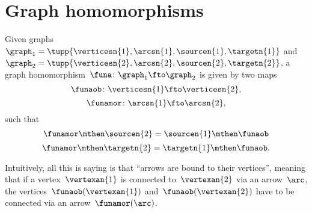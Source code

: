 
\section{Graph homomorphisms}
\begin{definition}
    \label{def:graph_homom}
    Given graphs~$\graph_1=\tupp{\verticesn{1},\arcsn{1},\sourcen{1},\targetn{1}}$ and~$\graph_2=\tupp{\verticesn{2},\arcsn{2},\sourcen{2},\targetn{2}}$, a graph homomorphism~$\funa \colon \graph_1 \fto \graph_2$ is given by two maps~
    \begin{equation}
        \funaob\colon \verticesn{1} \fto \verticesn{2},
    \end{equation}
    \begin{equation}
        \funamor\colon \arcsn{1} \fto \arcsn{2},
    \end{equation}
    such that
    \begin{equation}
        \funamor \mthen \sourcen{2} = \sourcen{1}\mthen \funaob
    \end{equation}
    \begin{equation}
        \funamor \mthen \targetn{2} = \targetn{1}\mthen \funaob.
    \end{equation}
\end{definition}


\begin{remark}
    Intuitively, all this is saying is that ``arrows are bound to their vertices'', meaning that if a vertex~$\vertexan{1}$ is connected to~$\vertexan{2}$ via an arrow~$\arc$, the vertices~$\funaob(\vertexan{1})$ and~$\funaob(\vertexan{2})$ have to be connected via an arrow~$\funamor(\arc)$.
\end{remark}

